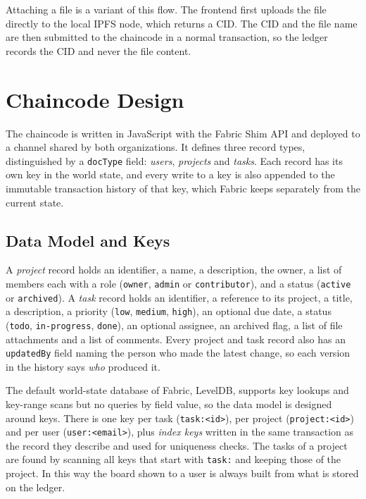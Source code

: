 Attaching a file is a variant of this flow. The frontend first uploads the file directly to the local IPFS node, which returns a CID. The CID and the file name are then submitted to the chaincode in a normal transaction, so the ledger records the CID and never the file content.

\section{Chaincode Design}
\label{sec:chaincode-design}

The chaincode is written in JavaScript with the Fabric Shim API and deployed to a channel shared by both organizations. It defines three record types, distinguished by a \texttt{docType} field: \emph{users}, \emph{projects} and \emph{tasks}. Each record has its own key in the world state, and every write to a key is also appended to the immutable transaction history of that key, which Fabric keeps separately from the current state.

\subsection{Data Model and Keys}

A \emph{project} record holds an identifier, a name, a description, the owner, a list of members each with a role (\texttt{owner}, \texttt{admin} or \texttt{contributor}), and a status (\texttt{active} or \texttt{archived}). A \emph{task} record holds an identifier, a reference to its project, a title, a description, a priority (\texttt{low}, \texttt{medium}, \texttt{high}), an optional due date, a status (\texttt{todo}, \texttt{in-progress}, \texttt{done}), an optional assignee, an archived flag, a list of file attachments and a list of comments. Every project and task record also has an \texttt{updatedBy} field naming the person who made the latest change, so each version in the history says \emph{who} produced it.

The default world-state database of Fabric, LevelDB, supports key lookups and key-range scans but no queries by field value, so the data model is designed around keys. There is one key per task (\texttt{task:<id>}), per project (\texttt{project:<id>}) and per user (\texttt{user:<email>}), plus \emph{index keys} written in the same transaction as the record they describe and used for uniqueness checks. The tasks of a project are found by scanning all keys that start with \texttt{task:} and keeping those of the project. In this way the board shown to a user is always built from what is stored on the ledger.

